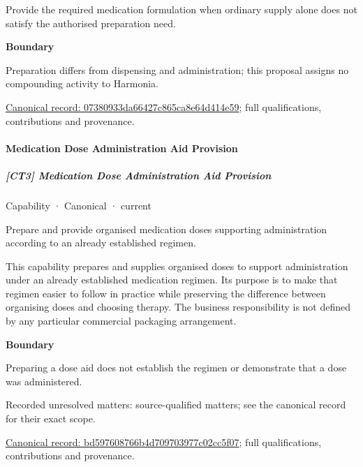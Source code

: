 Provide the required medication formulation when ordinary supply alone does not satisfy the authorised preparation need.



\textbf{Boundary}



Preparation differs from dispensing and administration; this proposal assigns no compounding activity to Harmonia.


{\footnotesize \href{../../../../continuum/strategy/capability/07380933da66427c865ca8e64d414e59.md}{Canonical record: 07380933da66427c865ca8e64d414e59}; full qualifications, contributions and provenance.}\par
\paragraph{Medication Dose Administration Aid Provision}

\subparagraph{[CT3] Medication Dose Administration Aid Provision}

\label{element:bd597608766b4d709703977c02cc5f07}
{\small Capability · Canonical · current}\par

Prepare and provide organised medication doses supporting administration according to an already established regimen.



This capability prepares and supplies organised doses to support administration under an already established medication regimen. Its purpose is to make that regimen easier to follow in practice while preserving the difference between organising doses and choosing therapy. The business responsibility is not defined by any particular commercial packaging arrangement.



\textbf{Boundary}



Preparing a dose aid does not establish the regimen or demonstrate that a dose was administered.


{\small Recorded unresolved matters: source-qualified matters; see the canonical record for their exact scope.}\par
{\footnotesize \href{../../../../continuum/strategy/capability/bd597608766b4d709703977c02cc5f07.md}{Canonical record: bd597608766b4d709703977c02cc5f07}; full qualifications, contributions and provenance.}\par
